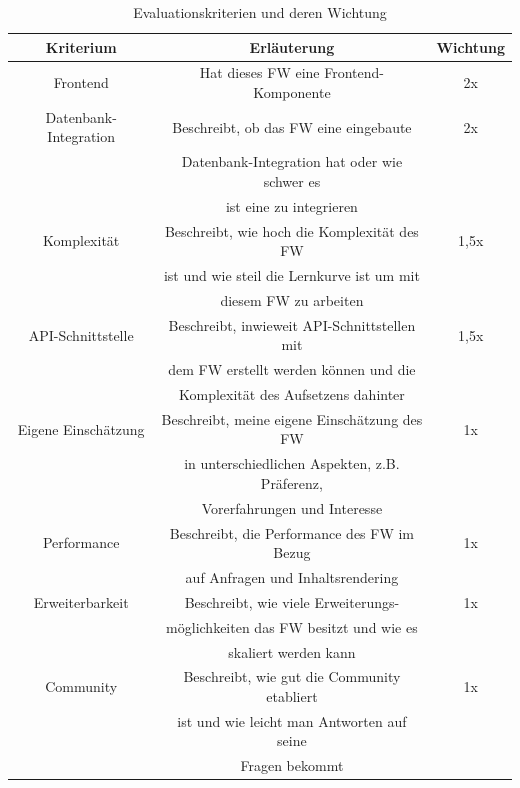 \documentclass[letterpaper,11pt,leqno]{article}
\begin{document}
\begin{table}[h!]
	\begin{center}
		\begin{tabular}{|c||c|c|}
			\hline
			Kriterium & Erläuterung & Wichtung\\
			\hline\hline
			Frontend & Hat dieses FW eine Frontend-Komponente & 2x\\
			\hline
			Datenbank-Integration & Beschreibt, ob das FW eine eingebaute & 2x\\
			& Datenbank-Integration hat oder wie schwer es &\\
			& ist eine zu integrieren &\\
			\hline
			Komplexität & Beschreibt, wie hoch die Komplexität des FW & 1,5x\\
			& ist und wie steil die Lernkurve ist um mit &\\
			& diesem FW zu arbeiten &\\
			\hline
			API-Schnittstelle & Beschreibt, inwieweit API-Schnittstellen mit & 1,5x\\
			& dem FW erstellt werden können und die &\\
			& Komplexität des Aufsetzens dahinter &\\
			\hline
			Eigene Einschätzung & Beschreibt, meine eigene Einschätzung des FW & 1x\\
			& in unterschiedlichen Aspekten, z.B. Präferenz, &\\
			& Vorerfahrungen und Interesse &\\
			\hline
			Performance & Beschreibt, die Performance des FW im Bezug & 1x\\
			& auf Anfragen und Inhaltsrendering &\\
			\hline
			Erweiterbarkeit & Beschreibt, wie viele Erweiterungs- & 1x\\
			& möglichkeiten das FW besitzt und wie es &\\
			& skaliert werden kann &\\
			\hline
			Community & Beschreibt, wie gut die Community etabliert & 1x\\
			& ist und wie leicht man Antworten auf seine &\\
			& Fragen bekommt &\\
			\hline
		\end{tabular}
		\caption{Evaluationskriterien und deren Wichtung}
	\end{center}
	\label{table:1}
\end{table}
\end{document}
